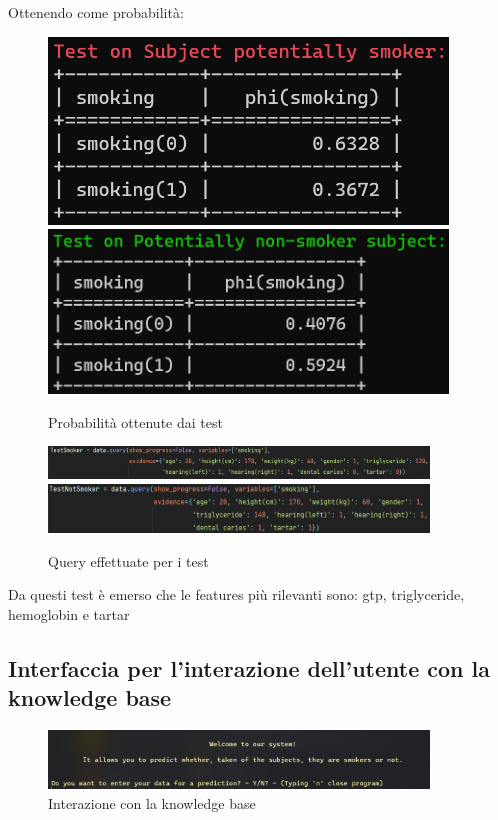 \documentclass{article}
\begin{document}
\noindent
Ottenendo come probabilità:

\begin{figure}[H]
        \includegraphics[width=10.6cm]{testSmoke}
        \includegraphics[width=10.6cm]{testNotSmoke}
        \centering
        \caption{Probabilità ottenute dai test}
        \centering
\end{figure}

\begin{figure}[H]
        \includegraphics[width=0.9\textwidth]{queryTestSmok}
        \includegraphics[width=0.9\textwidth]{queryTestNotSMok}
        \centering
        \caption{Query effettuate per i test}
        \centering
\end{figure}
%

\noindent
Da questi test è emerso che le features più rilevanti sono: gtp, triglyceride, hemoglobin e tartar
\subsection{Interfaccia per l'interazione dell'utente con la knowledge base}

\begin{figure}[H]
        \includegraphics[width=0.9\textwidth]{welcome}
        \centering
        \caption{Interazione con la knowledge base}
        \centering
\end{figure}
\end{document}
